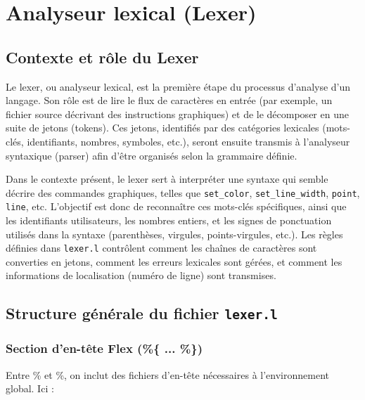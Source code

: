 \documentclass[12pt,a4paper]{article}
\begin{document}
\newpage
\section{Analyseur lexical (Lexer)}

\subsection{Contexte et rôle du Lexer}

Le lexer, ou analyseur lexical, est la première étape du processus d’analyse d’un langage. Son rôle est de lire le flux de caractères en entrée (par exemple, un fichier source décrivant des instructions graphiques) et de le décomposer en une suite de jetons (tokens). Ces jetons, identifiés par des catégories lexicales (mots-clés, identifiants, nombres, symboles, etc.), seront ensuite transmis à l’analyseur syntaxique (parser) afin d’être organisés selon la grammaire définie. \newline

Dans le contexte présent, le lexer sert à interpréter une syntaxe qui semble décrire des commandes graphiques, telles que \texttt{set\_color}, \texttt{set\_line\_width}, \texttt{point}, \texttt{line}, etc. L’objectif est donc de reconnaître ces mots-clés spécifiques, ainsi que les identifiants utilisateurs, les nombres entiers, et les signes de ponctuation utilisés dans la syntaxe (parenthèses, virgules, points-virgules, etc.). Les règles définies dans \texttt{lexer.l} contrôlent comment les chaînes de caractères sont converties en jetons, comment les erreurs lexicales sont gérées, et comment les informations de localisation (numéro de ligne) sont transmises.

\subsection{Structure générale du fichier \texttt{lexer.l}}

\subsubsection{Section d’en-tête Flex (\%\{ ... \%\})}

Entre \%{ et \%}, on inclut des fichiers d’en-tête nécessaires à l’environnement global. Ici :
\end{document}
